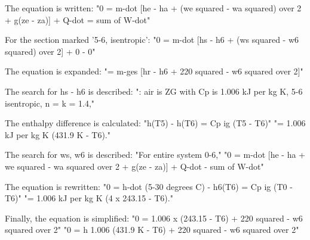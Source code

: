 The equation is written: 
"0 = m-dot [he - ha + (we squared - wa squared) over 2 + g(ze - za)] + Q-dot = sum of W-dot"

For the section marked '5-6, isentropic':
"0 = m-dot [hs - h6 + (ws squared - w6 squared) over 2] + 0 - 0"

The equation is expanded:
"= m-ges [hr - h6 + 220 squared - w6 squared over 2]"

The search for hs - h6 is described:
": air is ZG with Cp is 1.006 kJ per kg K, 5-6 isentropic, n = k = 1.4,"

The enthalpy difference is calculated:
"h(T5) - h(T6) = Cp ig (T5 - T6)"
"= 1.006 kJ per kg K (431.9 K - T6)."

The search for ws, w6 is described:
"For entire system 0-6,"
"0 = m-dot [he - ha + we squared - wa squared over 2 + g(ze - za)] + Q-dot - sum of W-dot"

The equation is rewritten:
"0 = h-dot (5-30 degrees C) - h6(T6) = Cp ig (T0 - T6)"
"= 1.006 kJ per kg K (4 x 243.15 - T6)."

Finally, the equation is simplified:
"0 = 1.006 x (243.15 - T6) + 220 squared - w6 squared over 2"
"0 = h 1.006 (431.9 K - T6) + 220 squared - w6 squared over 2"